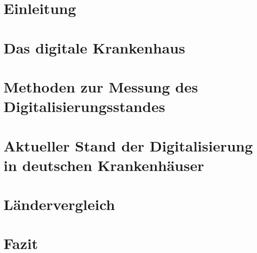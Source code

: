 
% 
{}
\section{Einleitung}

\section{Das digitale Krankenhaus}

\section{Methoden zur Messung des Digitalisierungsstandes}

\section{Aktueller Stand der Digitalisierung in deutschen Krankenhäuser} \label{sec:stand in deutschland}

\section{Ländervergleich} \label{sec:laendervergleich}

\section{Fazit}

\newpage
{}
\setcounter{page}{3}
\listoftables
\newpage
\listoffigures
\newpage
\printbibliography
{}

